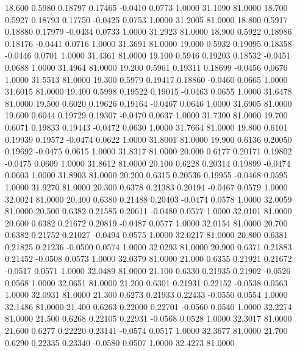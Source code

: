   18.600   0.5980   0.18797   0.17465  -0.0410   0.0773   1.0000  31.1090  81.0000
  18.700   0.5927   0.18793   0.17750  -0.0425   0.0753   1.0000  31.2005  81.0000
  18.800   0.5917   0.18880   0.17979  -0.0434   0.0733   1.0000  31.2923  81.0000
  18.900   0.5922   0.18986   0.18176  -0.0441   0.0716   1.0000  31.3691  81.0000
  19.000   0.5932   0.19095   0.18358  -0.0446   0.0701   1.0000  31.4361  81.0000
  19.100   0.5946   0.19203   0.18532  -0.0451   0.0688   1.0000  31.4964  81.0000
  19.200   0.5961   0.19311   0.18699  -0.0456   0.0676   1.0000  31.5513  81.0000
  19.300   0.5979   0.19417   0.18860  -0.0460   0.0665   1.0000  31.6015  81.0000
  19.400   0.5998   0.19522   0.19015  -0.0463   0.0655   1.0000  31.6478  81.0000
  19.500   0.6020   0.19626   0.19164  -0.0467   0.0646   1.0000  31.6905  81.0000
  19.600   0.6044   0.19729   0.19307  -0.0470   0.0637   1.0000  31.7300  81.0000
  19.700   0.6071   0.19833   0.19443  -0.0472   0.0630   1.0000  31.7664  81.0000
  19.800   0.6101   0.19939   0.19572  -0.0474   0.0622   1.0000  31.8001  81.0000
  19.900   0.6136   0.20050   0.19692  -0.0475   0.0615   1.0000  31.8317  81.0000
  20.000   0.6177   0.20171   0.19802  -0.0475   0.0609   1.0000  31.8612  81.0000
  20.100   0.6228   0.20314   0.19899  -0.0474   0.0603   1.0000  31.8903  81.0000
  20.200   0.6315   0.20536   0.19955  -0.0468   0.0595   1.0000  31.9270  81.0000
  20.300   0.6378   0.21383   0.20194  -0.0467   0.0579   1.0000  32.0024  81.0000
  20.400   0.6380   0.21488   0.20403  -0.0474   0.0578   1.0000  32.0059  81.0000
  20.500   0.6382   0.21585   0.20611  -0.0480   0.0577   1.0000  32.0101  81.0000
  20.600   0.6382   0.21672   0.20819  -0.0487   0.0577   1.0000  32.0154  81.0000
  20.700   0.6382   0.21752   0.21027  -0.0494   0.0575   1.0000  32.0217  81.0000
  20.800   0.6381   0.21825   0.21236  -0.0500   0.0574   1.0000  32.0293  81.0000
  20.900   0.6371   0.21883   0.21452  -0.0508   0.0573   1.0000  32.0379  81.0000
  21.000   0.6355   0.21921   0.21672  -0.0517   0.0571   1.0000  32.0489  81.0000
  21.100   0.6330   0.21935   0.21902  -0.0526   0.0568   1.0000  32.0651  81.0000
  21.200   0.6301   0.21931   0.22152  -0.0538   0.0563   1.0000  32.0931  81.0000
  21.300   0.6273   0.21933   0.22433  -0.0550   0.0554   1.0000  32.1486  81.0000
  21.400   0.6263   0.22000   0.22701  -0.0560   0.0540   1.0000  32.2274  81.0000
  21.500   0.6268   0.22105   0.22931  -0.0568   0.0528   1.0000  32.3017  81.0000
  21.600   0.6277   0.22220   0.23141  -0.0574   0.0517   1.0000  32.3677  81.0000
  21.700   0.6290   0.22335   0.23340  -0.0580   0.0507   1.0000  32.4273  81.0000
